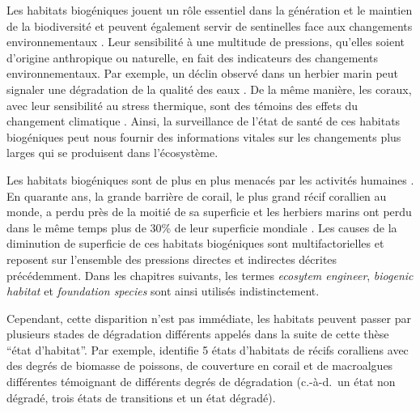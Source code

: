 \begin{refsection}
Les habitats biogéniques jouent un rôle essentiel dans la génération et
le maintien de la biodiversité et peuvent également servir de
sentinelles face aux changements environnementaux \autocites[
]{Roca_2016}[ ]{Nugues_2003}{Fredericq_2019}. Leur sensibilité à une
multitude de pressions, qu'elles soient d'origine anthropique ou
naturelle, en fait des indicateurs des changements environnementaux. Par
exemple, un déclin observé dans un herbier marin peut signaler une
dégradation de la qualité des eaux \autocite{Roca_2016}. De la même
manière, les coraux, avec leur sensibilité au stress thermique, sont des
témoins des effets du changement climatique
\autocite{Hoegh-Guldberg_1999}. Ainsi, la surveillance de l'état de
santé de ces habitats biogéniques peut nous fournir des informations
vitales sur les changements plus larges qui se produisent dans
l'écosystème.

Les habitats biogéniques sont de plus en plus menacés par les activités
humaines \autocite{Wernberg_2023}. En quarante ans, la grande barrière
de corail, le plus grand récif corallien au monde, a perdu près de la
moitié de sa superficie \autocite{Hughes_2015} et les herbiers marins
ont perdu dans le même temps plus de 30\% de leur superficie mondiale
\autocites[ ]{Waycott_2009}{Dunic_2021}. Les causes de la diminution de
superficie de ces habitats biogéniques sont multifactorielles et
reposent sur l'ensemble des pressions directes et indirectes décrites
précédemment. Dans les chapitres suivants, les termes \emph{ecosytem
engineer}, \emph{biogenic habitat} et \emph{foundation species} sont
ainsi utilisés indistinctement.

Cependant, cette disparition n'est pas immédiate, les habitats peuvent
passer par plusieurs stades de dégradation différents appelés dans la
suite de cette thèse ``état d'habitat''. Par exemple,
\textcite{Donovan_2018} identifie 5 états d'habitats de récifs
coralliens avec des degrés de biomasse de poissons, de couverture en
corail et de macroalgues différentes témoignant de différents degrés de
dégradation (c.-à-d.~un état non dégradé, trois états de transitions et
un état dégradé).


\end{refsection}
